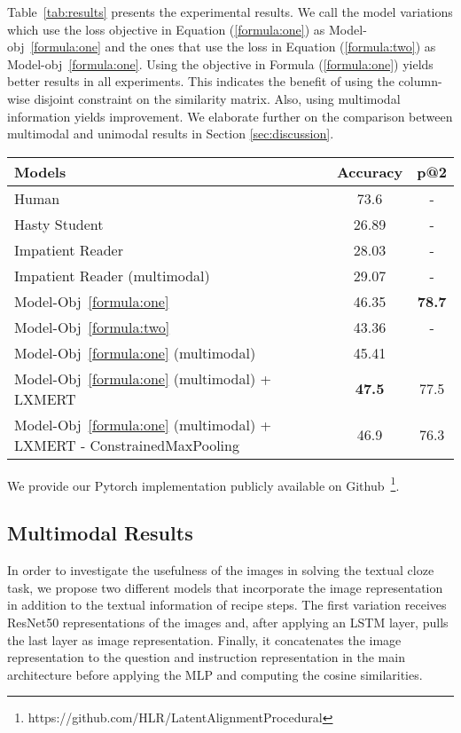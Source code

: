 \documentclass[11pt,a4paper]{article}
\begin{document}
Table~\ref{tab:results} presents the experimental results. We call the model variations which use the loss objective in Equation (\ref{formula:one}) as Model-obj~\ref{formula:one} and the ones that use the loss in Equation (\ref{formula:two}) as Model-obj~\ref{formula:one}. Using the objective in Formula (\ref{formula:one}) yields better results in all experiments. This indicates the benefit of using the column-wise disjoint constraint on the similarity matrix. Also, using multimodal information yields  improvement. We elaborate further on the comparison between multimodal and unimodal results in Section \ref{sec:discussion}. 
\begin{table*}[h]
\centering
    \begin{tabular}{lcc}
        \hline
         Models & Accuracy & p@2\\ \hline
         Human & 73.6 & - \\
         Hasty Student &  26.89 & - \\
         Impatient Reader & 28.03 & - \\
         Impatient Reader (multimodal) & 29.07 & - \\ \hline
         Model-Obj~\ref{formula:one} & 46.35 & \textbf{78.7}\\
         Model-Obj~\ref{formula:two} & 43.36 & - \\
         Model-Obj~\ref{formula:one} (multimodal) & 45.41 \\
         Model-Obj~\ref{formula:one} (multimodal) + LXMERT& \textbf{47.5} & 77.5\\ 
         Model-Obj~\ref{formula:one} (multimodal) + LXMERT - ConstrainedMaxPooling& 46.9 & 76.3 \\
         \hline
    \end{tabular}
    \caption{Evaluation on the test set}
    \label{tab:results}
\end{table*}

We provide our Pytorch implementation publicly available on Github~\footnote{https://github.com/HLR/LatentAlignmentProcedural}.
\subsection{Multimodal Results}
\label{sec:ablation}
In order to investigate the usefulness of the images in solving the textual cloze task, we propose two different models that incorporate the image representation in addition to the textual information of recipe steps. The first variation receives ResNet50 representations of the images and, after applying an LSTM layer, pulls the last layer as image representation. Finally, it concatenates the image representation to the question and instruction representation in the main architecture before applying the MLP and computing the cosine similarities. 
\end{document}
